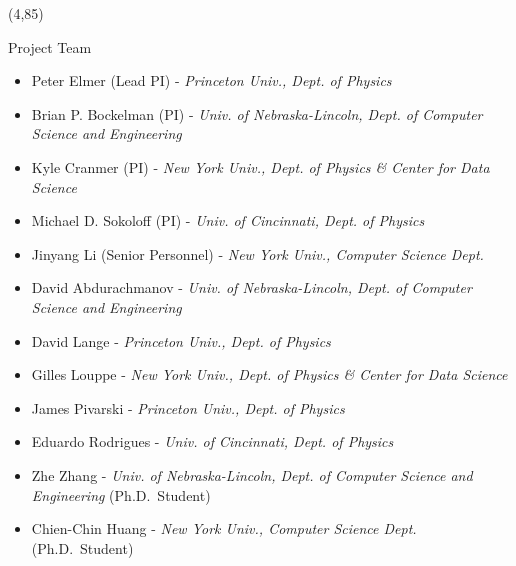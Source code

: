 \documentclass[final]{beamer}
\begin{document}
\begin{frame}{}







\begin{textblock}{38.0}(4,85)
\begin{block}{Project Team}
\begin{itemize}
\item Peter Elmer (Lead PI) - {\it Princeton Univ., Dept. of Physics}
\item Brian P. Bockelman (PI) - {\it Univ. of Nebraska-Lincoln, Dept. of Computer Science and Engineering}
\item Kyle Cranmer (PI) - {\it New York Univ., Dept. of Physics \& Center for Data Science}
\item Michael D. Sokoloff (PI) - {\it Univ. of Cincinnati, Dept. of Physics}
\item Jinyang Li (Senior Personnel) - {\it New York Univ., Computer Science Dept.}
\item David Abdurachmanov - {\it Univ. of Nebraska-Lincoln, Dept. of Computer Science and Engineering}
\item David Lange - {\it Princeton Univ., Dept. of Physics}
\item Gilles Louppe - {\it New York Univ., Dept. of Physics \& Center for Data Science}
\item James Pivarski - {\it Princeton Univ., Dept. of Physics}
\item Eduardo Rodrigues - {\it Univ. of Cincinnati, Dept. of Physics}
\item Zhe Zhang - {\it Univ. of Nebraska-Lincoln, Dept. of Computer Science and Engineering} (Ph.D.\ Student)
\item Chien-Chin Huang - {\it New York Univ., Computer Science Dept.} (Ph.D.\ Student)
\end{itemize}
\end{block}
\end{textblock}


\end{frame}
\end{document}
